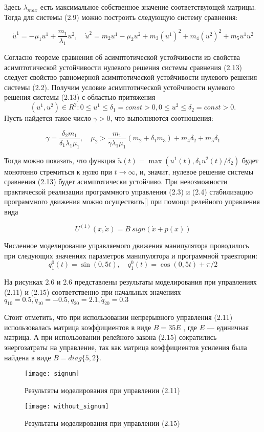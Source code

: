Здесь $\lambda_{max}$ есть максимальное собственное значение соответствующей матрицы. 
Тогда для системы (2.9) можно построить следующую систему сравнения:

\begin{equation}\label{2.4'}
\dot u^1 = - \mu_1 u^1 + \frac{m_1}{\lambda_1} u^2, \quad \dot u^2 = m_2 u^1 - \mu_2 u^2 + m_3 (u^1)^2 + m_4(u^2)^2 + m_5 u^1 u^2
\end{equation}

Согласно теореме сравнения об асимптотической устойчивости \cite{matrosov01} из свойства асимптотической устойчивости нулевого решения системы сравнения (2.13) следует свойство равномерной асимптотической устойчивости нулевого решения системы (2.2). Получим условие асимптотической устойчивости нулевого решения системы (2.13) с областью притяжения $$ {(u^1, u^2) \in R^2 : 0 \le u^1 \le \delta_1 = const>0, 0 \le u^2 \le \delta_2 = const>0}. $$ Пусть найдется такое число $\gamma>0$, что выполняются соотношения:

\begin{equation}\label{2.10'}
\gamma = \frac{\delta_2 m_1}{\delta_1 \lambda_1 \mu_1}, \quad \mu_2 > \frac{m_1}{\gamma \lambda_1 \mu_1} (m_2 + \delta_1 m_3) + m_4 \delta_2 + m_5 \delta_1
\end{equation}

Тогда можно показать, что функция $\widetilde{u}(t) = \max{(u^1(t), \delta_1 u^2(t)/ \delta_2)}$ будет монотонно стремиться к нулю при $t \to \infty$, и, значит, нулевое решение системы сравнения (2.13) будет асимптотически устойчиво.
При невозможности практической реализации программного управления (2.3) и (2.4) стабилизацию программного движения можно осуществить[] при помощи релейного управления вида

\begin{equation} \label{2.11'}
U^{(1)}(x, \dot x) = B \ sign(\dot x + p(x))
\end{equation}

Численное моделирование управляемого движения манипулятора проводилось при следующих значениях параметров манипулятора и программной траектории:
$$q_1^0(t) = \sin(0,5t), \quad q_1^0(t) = \cos(0,5t) + \pi/2$$

На рисунках 2.6 и 2.6 представлены результаты моделирования при управлениях (2.11) и (2.15) соответственно при начальных значениях $q_{10} = 0.5, \dot q_10 = -0.5, q_{20} = 2.1, \dot q_{20} = 0.3$ 

Стоит отметить, что при использовании непрерывного управления (2.11) использовалась матрица коэффициентов в виде $B=35E$ , где $E$  --- единичная матрица. А при использовании релейного закона (2.15) сократились энергозатраты на управление, так как матрица коэффициентов усиления была найдена в виде $B = diag \lbrace 5, 2 \rbrace.$ 

\begin{figure}[h]
 	\centering
 	\texttt{[image: signum]}
 	\caption{Результаты моделирования при управлении (2.11)}
\end{figure}

\begin{figure}[h]
	\centering
	\texttt{[image: without\_signum]}
	\caption{Результаты моделирования при управлении (2.15)}
\end{figure}
